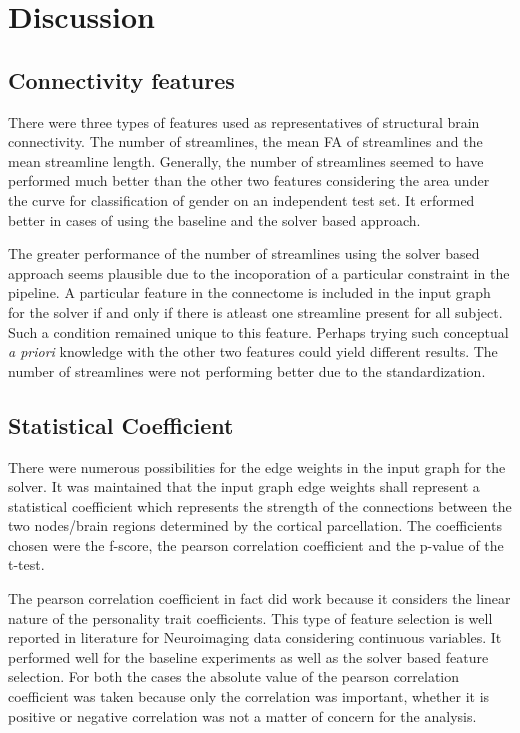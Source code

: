 \documentclass[msthesis.tex]{subfiles}
\begin{document}
\chapter{Discussion}


\section{Connectivity features}
There were three types of features used as representatives of structural brain connectivity. The number of streamlines, the mean FA of streamlines and the mean streamline length. Generally, the number of streamlines seemed to have performed much better than the other two features considering the area under the curve for classification of gender on an independent test set. It erformed better in cases of using the baseline and the solver based approach.

The greater performance of the number of streamlines using the solver based approach seems plausible due to the incoporation of a particular constraint in the pipeline. A particular feature in the connectome is included in the input graph for the solver if and only if there is atleast one streamline present for all subject. Such a condition remained unique to this feature. Perhaps trying such conceptual \textit{a priori} knowledge with the other two features could yield different results. The number of streamlines were not performing better due to the standardization. 

\section{Statistical Coefficient}
There were numerous possibilities for the edge weights in the input graph for the solver. It was maintained that the input graph edge weights shall represent a statistical coefficient which represents the strength of the connections between the two nodes/brain regions determined by the cortical parcellation. The coefficients chosen were the f-score, the pearson correlation coefficient and the p-value of the t-test. 

The pearson correlation coefficient in fact did work because it considers the linear nature of the personality trait coefficients. This type of feature selection is well reported in literature for Neuroimaging data considering continuous variables. It performed well for the baseline experiments as well as the solver based feature selection. For both the cases the absolute value of the pearson correlation coefficient was taken because only the correlation was important, whether it is positive or negative correlation was not a matter of concern for the analysis.
\end{document}
